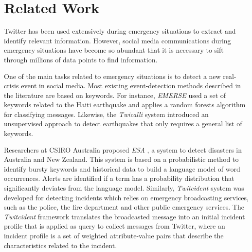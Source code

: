 \documentclass{llncs}
\begin{document}
\section{Related Work}



Twitter has been used extensively during emergency situations to extract and identify relevant information. However, social media communications during emergency situations have become so abundant that it is necessary to sift through millions of data points to find information.

One of the main tasks related to emergency situations is to detect a new real-crisis event in social media. Most existing event-detection methods described in the literature are based on keywords. For instance, \textit{EMERSE} \cite{caragea2011classifying} used a set of keywords related to the Haiti earthquake and applies a random forests algorithm for classifying messages. Likewise, the \textit{Twicalli} system \cite{maldonado2017} introduced an unsupervised approach to detect earthquakes that only requires a general list of keywords. 

Researchers at CSIRO Australia proposed \textit{ESA} \cite{cameron2012emergency}, a system to detect disasters in Australia and New Zealand. This system is based on a probabilistic method to identify bursty keywords and historical data to build a language model of word occurrences. Alerts are identified if a term has a probability distribution that significantly deviates from the language model. Similarly, \textit{Twitcident} \cite{abel2012twitcident} system was developed for detecting incidents which relies on emergency broadcasting services, such as the police, the fire department and other public emergency services. The \textit{Twitcident} framework translates the broadcasted message into an initial incident profile that is applied as query to collect messages from Twitter, where an incident profile is a set of weighted attribute-value pairs that describe the characteristics related to the incident. 

\end{document}
